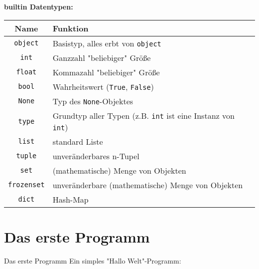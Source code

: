 \begin{frame}
	\textbf{builtin Datentypen:}\\
	\begin{tabular}{c|l}
		Name & Funktion \\ \hline
		\texttt{object} & Basistyp, alles erbt von \texttt{object} \\
		\texttt{int} & Ganzzahl "beliebiger" Größe \\
		\texttt{float} & Kommazahl "beliebiger" Größe \\
		\texttt{bool} & Wahrheitswert (\texttt{True}, \texttt{False})\\
		\texttt{None} & Typ des \texttt{None}-Objektes \\
		\texttt{type} & Grundtyp aller Typen (z.B. \texttt{int} ist eine Instanz von \texttt{int}) \\
		\texttt{list} & standard Liste \\
		\texttt{tuple} & unveränderbares n-Tupel \\
		\texttt{set} & (mathematische) Menge von Objekten \\
		\texttt{frozenset} & unveränderbare (mathematische) Menge von Objekten \\
		\texttt{dict} & Hash-Map \\
	\end{tabular}
\end{frame}


\section{Das erste Programm}
\begin{frame}[fragile]{Das erste Programm}
	Ein simples "Hallo Welt"-Programm:\\[.5cm]
	
\end{frame}


